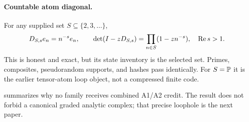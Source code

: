 \paragraph{Countable atom diagonal.}
For any supplied set $S\subseteq\{2,3,\ldots\}$,
\[
  D_{S,s}e_n=n^{-s}e_n,\qquad
  \det(I-zD_{S,s})=\prod_{n\in S}(1-zn^{-s}),\quad\operatorname{Re} s>1.
\]
This is honest and exact, but its state inventory is the selected set.
Primes, composites, pseudorandom supports, and hashes pass identically.
For $S=\mathbb P$ it is the earlier tensor-atom loop object, not a compressed
finite code.

 summarizes why no family receives combined A1/A2 credit.
The result does not forbid a canonical graded analytic complex; that precise
loophole is the next paper.

